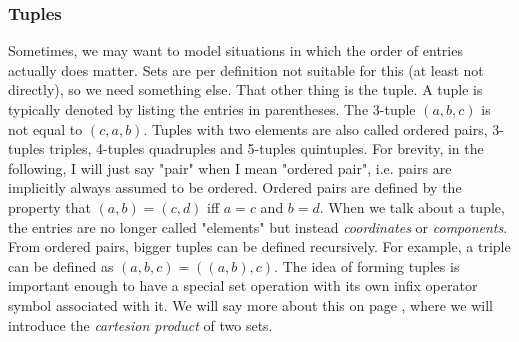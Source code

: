 


\subsubsection{Tuples}
Sometimes, we may want to model situations in which the order of entries actually does matter. Sets are per definition not suitable for this (at least not directly), so we need something else. That other thing is the tuple. A tuple is typically denoted by listing the entries in parentheses. The 3-tuple $(a,b,c)$ is not equal to $(c,a,b)$. Tuples with two elements are also called ordered pairs, 3-tuples triples, 4-tuples quadruples and 5-tuples quintuples. For brevity, in the following, I will just say "pair" when I mean "ordered pair", i.e. pairs are implicitly always assumed to be ordered. Ordered pairs are defined by the property that $(a,b) = (c,d)$ iff $a = c$ and $b = d$. When we talk about a tuple, the entries are no longer called "elements" but instead \emph{coordinates} or \emph{components}. From ordered pairs, bigger tuples can be defined recursively. For example, a triple can be defined as $(a,b,c) = ((a,b),c)$. The idea of forming tuples is important enough to have a special set operation with its own infix operator symbol associated with it. We will say more about this on page \pageref{Par:SetAlgebra}, where we will introduce the \emph{cartesion product} of two sets.

% 

